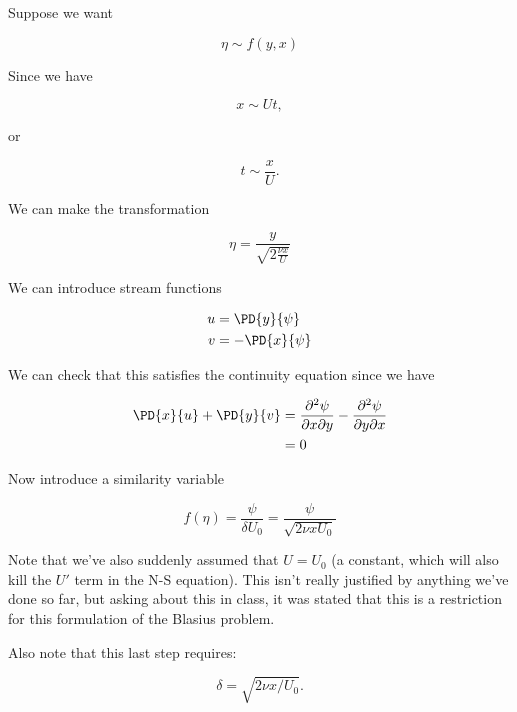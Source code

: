 Suppose we want

\begin{equation}\label{eqn:continuumL19:250}
\eta \sim f(y, x)
\end{equation}

Since we have

\begin{equation}\label{eqn:continuumL19:270}
x \sim U t,
\end{equation}

or

\begin{equation}\label{eqn:continuumL19:290}
t \sim \frac{x}{U}.
\end{equation}

We can make the transformation

\begin{equation}\label{eqn:continuumL19:310}
\eta = \frac{y}{\sqrt{2 \frac{\nu x}{U}}}
\end{equation}

We can introduce stream functions

\begin{align}\label{eqn:continuumProblemSet2:330}
u &= \PD{y}{\psi} \\
v &= -\PD{x}{\psi}
\end{align}

We can check that this satisfies the continuity equation since we have

\begin{align*}
\PD{x}{u} + \PD{y}{v} 
&=
\frac{\partial^2 \psi}{\partial x \partial y}
-\frac{\partial^2 \psi}{\partial y \partial x} \\
&= 0
\end{align*}

Now introduce a similarity variable 

\begin{equation}\label{eqn:continuumL19:350}
f(\eta) = \frac{\psi}{\delta U_0} = \frac{\psi}{\sqrt{2 \nu x U_0}}
\end{equation}

Note that we've also suddenly assumed that $U = U_0$ (a constant, which will also kill the $U'$ term in the N-S equation).  This isn't really justified by anything we've done so far, but asking about this in class, it was stated that this is a restriction for this formulation of the Blasius problem.

Also note that this last step requires:

\begin{equation}\label{eqn:continuumL19:730}
\delta = \sqrt{ 2 \nu x/U_0 }.
\end{equation}

